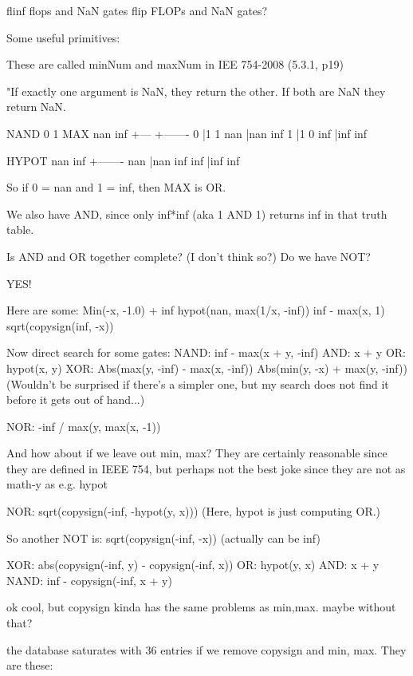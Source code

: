 
flinf flops and NaN gates
flip FLOPs and NaN gates?



Some useful primitives:

        These are called minNum and maxNum in IEE 754-2008 (5.3.1, p19)

        "If exactly one argument is NaN, they return the other.
        If both are NaN they return NaN.

        NAND  0 1     MAX  nan inf
             +---         +-------
           0 |1 1     nan |nan inf
           1 |1 0     inf |inf inf

                    HYPOT  nan inf
                          +-------
                      nan |nan inf
                      inf |inf inf

        So if 0 = nan and 1 = inf, then MAX is OR.

        We also have AND, since only inf*inf (aka 1 AND 1)
        returns inf in that truth table.

        Is AND and OR together complete? (I don't think so?)
        Do we have NOT?


YES!

Here are some:
Min(-x, -1.0) + inf
hypot(nan, max(1/x, -inf))
inf - max(x, 1)
sqrt(copysign(inf, -x))


Now direct search for some gates:
NAND: inf - max(x + y, -inf)
AND: x + y
OR: hypot(x, y)
XOR: Abs(max(y, -inf) - max(x, -inf))
     Abs(min(y, -x) + max(y, -inf))
     (Wouldn't be surprised if there's a simpler one,
     but my search does not find it before it gets
     out of hand...)
    
NOR: -inf / max(y, max(x, -1))
     


And how about if we leave out min, max? They are certainly
reasonable since they are defined in IEEE 754, but perhaps
not the best joke since they are not as math-y as e.g. hypot


NOR: sqrt(copysign(-inf, -hypot(y, x)))
(Here, hypot is just computing OR.)

So another NOT is:
sqrt(copysign(-inf, -x))  (actually can be inf)

XOR: abs(copysign(-inf, y) - copysign(-inf, x))
OR: hypot(y, x)
AND: x + y
NAND: inf - copysign(-inf, x + y)


ok cool, but copysign kinda has the same problems as min,max.
maybe without that?


the database saturates with 36 entries if we remove
copysign and min, max. They are these:

